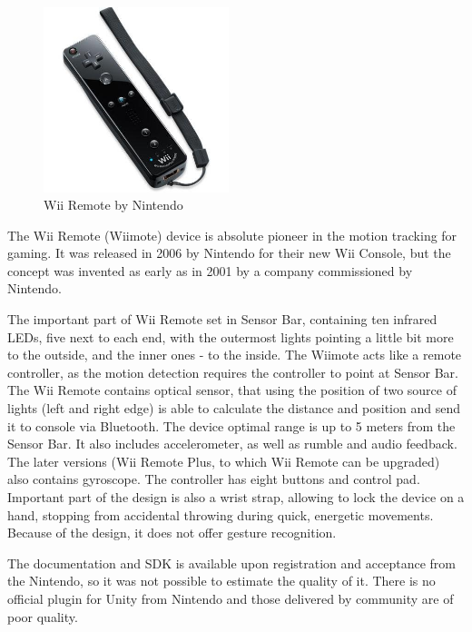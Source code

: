 \begin{figure}
\includegraphics[width=0.48\textwidth]{graphics/wiiremote.jpg} 
\caption{Wii Remote by Nintendo}
\vspace{-10pt}
\label{fig:wii}
\end{figure}

The Wii Remote (Wiimote) device is absolute pioneer in the motion tracking for gaming. It was released in 2006 by Nintendo for their new Wii Console, but the concept was invented as early as in 2001 by a company commissioned by Nintendo. 

The important part of Wii Remote set in Sensor Bar, containing ten infrared LEDs, five next to each end, with the outermost lights pointing a little bit more to the outside, and the inner ones - to the inside. The Wiimote acts like a remote controller, as the motion detection requires the controller to point at Sensor Bar. The Wii Remote contains optical sensor, that using the position of two source of lights (left and right edge) is able to calculate the distance and position and send it to console via Bluetooth. The device optimal range is up to 5 meters from the Sensor Bar. It also includes accelerometer, as well as rumble and audio feedback. The later versions (Wii Remote Plus, to which Wii Remote can be upgraded) also contains gyroscope. The controller has eight buttons and control pad. Important part of the design is also a wrist strap, allowing to lock the device on a hand, stopping from accidental throwing during quick, energetic movements. Because of the design, it does not offer gesture recognition.

The documentation and SDK is available upon registration and acceptance from the Nintendo, so it was not possible to estimate the quality of it. There is no official plugin for Unity from Nintendo and those delivered by community are of poor quality. 

